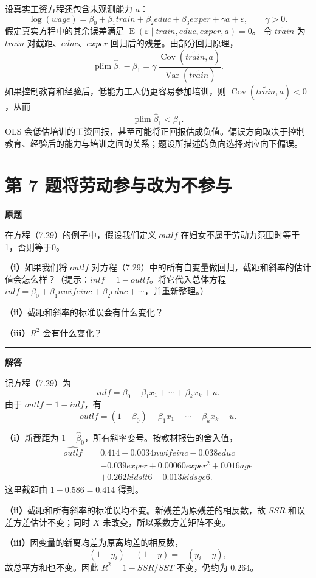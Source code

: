 \documentclass[UTF8,a4paper,11pt,fontset=fandol]{ctexart}
\newcommand{\vr}[1]{\mathit{#1}}
\newcommand{\E}{\operatorname{E}}
\newcommand{\Var}{\operatorname{Var}}
\newcommand{\Cov}{\operatorname{Cov}}
\newcommand{\subq}[1]{\par\medskip\noindent\textbf{（#1）}\enspace}
\newcommand{\question}[2]{\def\currentquestiontitle{第 #1 题\quad #2}}
\newenvironment{originalquestion}{%
  \par\medskip\noindent\begin{minipage}{\linewidth}
  \section*{\currentquestiontitle}
  \par\smallskip\noindent\textbf{原题}\par\smallskip
  \begingroup\small\setlength{\parskip}{2.5pt}%
}{%
  \par\endgroup\end{minipage}\par\medskip\Needspace{6\baselineskip}
  \noindent\rule{\linewidth}{0.35pt}\par\smallskip
  \noindent\textbf{解答}\par
}
\begin{document}
设真实工资方程还包含未观测能力 $a$：
\[
\log(\vr{wage})=\beta_0+\beta_1\vr{train}
+\beta_2\vr{educ}+\beta_3\vr{exper}+\gamma a+\varepsilon,
\qquad \gamma>0.
\]
假定真实方程中的其余误差满足 $\E(\varepsilon\mid\vr{train},\vr{educ},\vr{exper},a)=0$。
令 $\widetilde{\vr{train}}$ 为 $\vr{train}$ 对截距、$\vr{educ}$、$\vr{exper}$ 回归后的残差。由部分回归原理，
\[
\operatorname{plim}\widehat\beta_1-\beta_1
=\gamma\,\frac{\Cov(\widetilde{\vr{train}},a)}
{\Var(\widetilde{\vr{train}})}.
\]
如果控制教育和经验后，低能力工人仍更容易参加培训，则
$\Cov(\widetilde{\vr{train}},a)<0$，从而
\[
\boxed{\operatorname{plim}\widehat\beta_1<\beta_1}.
\]
OLS 会低估培训的工资回报，甚至可能将正回报估成负值。偏误方向取决于控制教育、经验后的能力与培训之间的关系；题设所描述的负向选择对应向下偏误。

\question{7}{将劳动参与改为不参与}
\begin{originalquestion}
在方程（7.29）的例子中，假设我们定义 $\vr{outlf}$ 在妇女不属于劳动力范围时等于1，否则等于0。

\subq{i}如果我们将 $\vr{outlf}$ 对方程（7.29）中的所有自变量做回归，截距和斜率的估计值会怎么样？（提示：$\vr{inlf}=1-\vr{outlf}$。将它代入总体方程 $\vr{inlf}=\beta_0+\beta_1\vr{nwifeinc}+\beta_2\vr{educ}+\cdots$，并重新整理。）

\subq{ii}截距和斜率的标准误会有什么变化？

\subq{iii}$R^2$ 会有什么变化？
\end{originalquestion}

记方程（7.29）为
\[
\vr{inlf}=\beta_0+\beta_1x_1+\cdots+\beta_kx_k+u.
\]
由于 $\vr{outlf}=1-\vr{inlf}$，有
\[
\vr{outlf}=(1-\beta_0)-\beta_1x_1-\cdots-\beta_kx_k-u.
\]
\subq{i}新截距为 $1-\widehat\beta_0$，所有斜率变号。按教材报告的舍入值，
\[
\begin{aligned}
\widehat{\vr{outlf}}={}&0.414+0.0034\vr{nwifeinc}-0.038\vr{educ}\\
&-0.039\vr{exper}+0.00060\vr{exper}^2+0.016\vr{age}\\
&+0.262\vr{kidslt6}-0.013\vr{kidsge6}.
\end{aligned}
\]
这里截距由 $1-0.586=0.414$ 得到。

\subq{ii}截距和所有斜率的标准误均不变。新残差为原残差的相反数，故 $SSR$ 和误差方差估计不变；同时 $X$ 未改变，所以系数方差矩阵不变。

\subq{iii}因变量的新离均差为原离均差的相反数，
\[
(1-y_i)-(1-\bar y)=-(y_i-\bar y),
\]
故总平方和也不变。因此 $R^2=1-SSR/SST$ 不变，仍约为 $0.264$。
\end{document}
